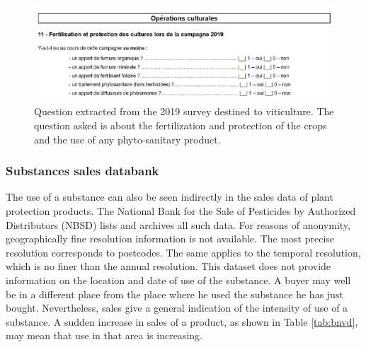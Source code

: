 \begin{figure}[ht]
    \centering
    \includegraphics[scale=0.75]{figs/Chap3/PK1.pdf}
    \caption{Question extracted from the 2019 survey destined to viticulture. The question asked is about the fertilization and protection of the crops and the use of any phyto-sanitary product.}
    \label{fig:PK1}
\end{figure}

\subsubsection{Substances sales databank}

The use of a substance can also be seen indirectly in the sales data of plant protection products. The National Bank for the Sale of Pesticides by Authorized Distributors (NBSD) \cite{BNVD} lists and archives all such data. For reasons of anonymity, geographically fine resolution information is not available. The most precise resolution corresponds to postcodes. The same applies to the temporal resolution, which is no finer than the annual resolution. This dataset does not provide information on the location and date of use of the substance. A buyer may well be in a different place from the place where he used the substance he has just bought. Nevertheless, sales give a general indication of the intensity of use of a substance. A sudden increase in sales of a product, as shown in Table \ref{tab:bnvd}, may mean that use in that area is increasing.

